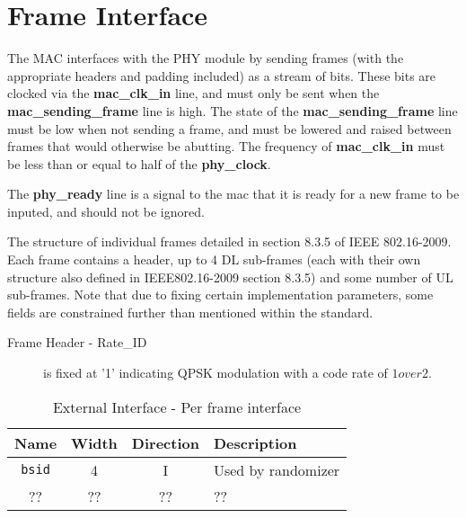 \documentclass[dvips,10pt,twocolumn]{article}
\begin{document}

\section{Frame Interface}
\label{sec:frame}
The MAC interfaces with the PHY module by sending frames (with the
appropriate headers and padding included) as a stream of bits.  These bits
are clocked via the \textbf{mac\_clk\_in} line, and must only be sent when
the \textbf{mac\_sending\_frame} line is high.  The state of the
\textbf{mac\_sending\_frame} line must be low when not sending a frame, and
must be lowered and raised between frames that would otherwise be abutting.
The frequency of \textbf{mac\_clk\_in} must be less than or equal to half
of the \textbf{phy\_clock}.

The \textbf{phy\_ready} line is a signal to the mac that it is ready for a
new frame to be inputed, and should not be ignored.

The structure of individual frames detailed in section 8.3.5 of IEEE
802.16-2009.  Each frame contains a header, up to 4 DL sub-frames (each with
their own structure also defined in IEEE802.16-2009 section 8.3.5) and some
number of UL sub-frames.  Note that due to fixing certain implementation
parameters, some fields are constrained further than mentioned within the
standard.

\begin{description}
	
	\item[Frame Header - Rate\_ID] is fixed at '1' indicating QPSK
		modulation with a code rate of $1 over 2$.
	

\end{description}

\begin{table*}
\begin{tabularx}{\textwidth}{c|c|c|X}
	\label{tbl:frame-io}
	Name & Width & Direction & Description\\ \hline

	\texttt{bsid} & 4 & I & Used by randomizer \\

	?? & ?? & ?? & ?? 

\end{tabularx}
\caption{External Interface - Per frame interface}
\end{table*}
\end{document}
